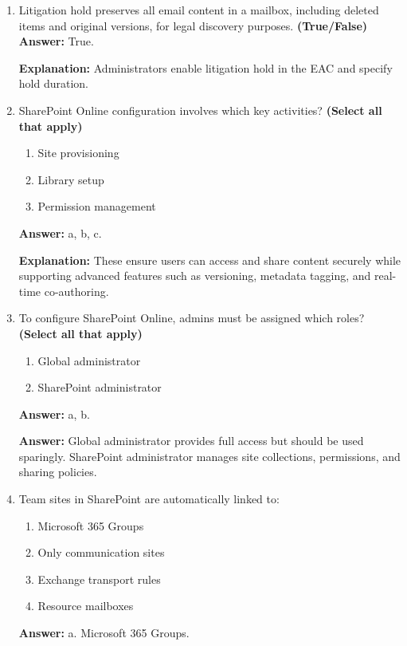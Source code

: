 \documentclass[10pt]{article}
\begin{document}
\begin{enumerate}[leftmargin=*]
\textbf{Explanation:} Administrators create retention tags and policies in the EAC and assign them to mailboxes.

\item Litigation hold preserves all email content in a mailbox, including deleted items and original versions, for legal discovery purposes. \textbf{(True/False)}
\textbf{Answer:} True.

\textbf{Explanation:} Administrators enable litigation hold in the EAC and specify hold duration.

\item SharePoint Online configuration involves which key activities? \textbf{(Select all that apply)}
\begin{enumerate}[label=\alph*., leftmargin=1.5em]
\item Site provisioning
\item Library setup
\item Permission management
\end{enumerate}
\textbf{Answer:} a, b, c.

\textbf{Explanation:} These ensure users can access and share content securely while supporting advanced features such as versioning, metadata tagging, and real-time co-authoring.

\item To configure SharePoint Online, admins must be assigned which roles? \textbf{(Select all that apply)}
\begin{enumerate}[label=\alph*., leftmargin=1.5em]
\item Global administrator
\item SharePoint administrator
\end{enumerate}
\textbf{Answer:} a, b.

\textbf{Answer:} Global administrator provides full access but should be used sparingly. SharePoint administrator manages site collections, permissions, and sharing policies.

\item Team sites in SharePoint are automatically linked to:
\begin{enumerate}[label=\alph*., leftmargin=1.5em]
\item Microsoft 365 Groups
\item Only communication sites
\item Exchange transport rules
\item Resource mailboxes
\end{enumerate}
\textbf{Answer:} a. Microsoft 365 Groups.


\end{enumerate}
\end{document}
